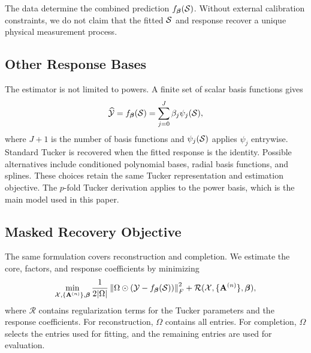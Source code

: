 The data determine the combined prediction $f_{\boldsymbol{\beta}}(\mathcal{S})$. Without external
calibration constraints, we do not claim that the fitted $\mathcal{S}$ and response
recover a unique physical measurement process.

\subsection{Other Response Bases}

The estimator is not limited to powers. A finite set of scalar basis functions
gives
\begin{equation}
  \widehat{\mathcal{Y}}
  =
  f_{\boldsymbol{\beta}}(\mathcal{S})
  =
  \sum_{j=0}^{J} \beta_j \psi_j(\mathcal{S}),
  \label{eq:finite_response_tucker}
\end{equation}
where $J+1$ is the number of basis functions and $\psi_j(\mathcal{S})$ applies
$\psi_j$ entrywise. Standard Tucker is recovered
when the fitted response is the identity. Possible alternatives include
conditioned polynomial bases, radial basis functions, and splines. These
choices retain the same Tucker representation and estimation objective. The
$p$-fold Tucker derivation applies to the power basis, which is the main
model used in this paper.

\subsection{Masked Recovery Objective}

The same formulation covers reconstruction and completion. We estimate the
core, factors, and response coefficients by minimizing
\begin{equation}
  \min_{\mathcal{X},\{\mathbf{A}^{(n)}\},\boldsymbol{\beta}}
  \frac{1}{2|\Omega|}
  \left\lVert \Omega \odot \left(\mathcal{Y} - f_{\boldsymbol{\beta}}(\mathcal{S})\right) \right\rVert_F^2
  +
  \mathcal{R}(\mathcal{X},\{\mathbf{A}^{(n)}\},\boldsymbol{\beta}),
  \label{eq:masked_objective_model}
\end{equation}
where $\mathcal{R}$ contains regularization terms for the Tucker parameters and
the response coefficients. For reconstruction, $\Omega$ contains all entries.
For completion, $\Omega$ selects the entries used for fitting, and the remaining
entries are used for evaluation.
